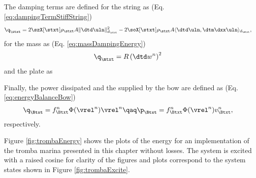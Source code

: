 The damping terms are defined for the string as (Eq. \eqref{eq:dampingTermStiffString})
\begin{equation*}
    \q_\stxt = 2\szX[\stxt] \rho_\stxt A \lVert\dtd\uln\rVert_{d_\stxt}^2 - 2 \soX[\stxt] \rho_\stxt A \langle \dtd \uln, \dtm \dxx \uln \rangle_{d_\stxt},
\end{equation*}  
for the mass as (Eq. \eqref{eq:massDampingEnergy})
\begin{equation*}
    \q_\mtxt = R\left(\dtd w^n \right)^2
\end{equation*}
and the plate as

Finally, the power dissipated and the supplied by the bow are defined as (Eq. \eqref{eq:energyBalanceBow})
\begin{equation*}
    \q_\Btxt =  f_\Btxt^n \Phi(\vrel^n) \vrel^n \qaq \p_\Btxt = f_\Btxt^n \Phi(\vrel^n)v_\Btxt^n,
\end{equation*}
respectively. 

Figure \ref{fig:trombaEnergy} shows the plots of the energy for an implementation of the tromba marina presented in this chapter without losses. The system is excited with a raised cosine for clarity of the figures and plots correspond to the system states shown in Figure \ref{fig:trombaExcite}.

    


